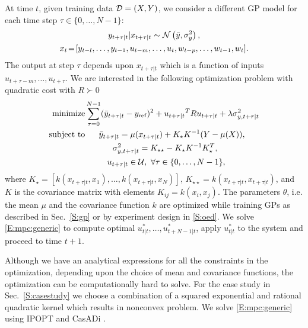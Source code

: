 At time \(t\), given training data \(\mathcal{D} = (X,Y) \), we consider a different GP model for each time step \(\tau \in \{0,\dots,N-1\}\):
\begin{gather}
y_{t+\tau|t} | x_{t+\tau|t} \sim \operatorname*{\mathcal{N}}\left(\bar{y}, \sigma^2_y\right), \\
x_{t}\!=\![y_{t-l}, \dots, y_{t-1}, u_{t-m}, \dots, u_t, w_{t-p}, \dots, w_{t-1}, w_t]. \nonumber
\end{gather}
The output at step \(\tau\) depends upon \(x_{t+\tau|t}\)  which is a function of inputs \(u_{t+\tau-m}, \dots, u_{t+\tau}\).
We are interested in the following optimization problem with quadratic cost with \(R \succ 0\)
\begin{align}
\label{E:mpc:generic}
\minimize & \sum_{\tau=0}^{N-1} (\bar{y}_{t+\tau|t}-y_{\mathrm{ref}})^2 + {u_{t+\tau|t}}^T R {u_{t+\tau|t}}+ \lambda \sigma^2_{y,t+\tau|t} \nonumber \\
\st & \ \ \ \ \ \bar{y}_{t+\tau|t} = \mu(x_{t+\tau|t}) + K_\star K^{-1} (Y - \mu(X)), \nonumber\\
& \ \ \ \ \ \ \ \ \ \ \sigma^2_{y,t+\tau|t} = K_{\star \star} - K_\star K^{-1} K_\star^T, \\
& \ \ \ \ \ \ \ \  u_{t+\tau|t} \in \mathcal{U}, \  \forall \tau \in \{0,\dots,N-1\}, \nonumber
\end{align}
where \(K_\star = [k(x_{t+\tau|t}, x_1), \dots, k(x_{t+\tau|t}, x_N)]\), \(K_{\star \star} = k(x_{t+\tau|t}, x_{t+\tau|t})\), and $K$ is the covariance matrix with elements \(K_{ij} = k(x_i, x_j)\). The parameters \(\theta\), i.e. the mean \(\mu\) and the covariance function \(k\) are optimized while training GPs as described in Sec.~\ref{S:gp} or by experiment design in \ref{S:oed}. We solve \eqref{E:mpc:generic} to compute optimal \(u_{t|t}^*, \dots, u_{t+N-1|t}^*\), apply \(u_{t|t}^*\) to the system and proceed to time \(t+1\).

Although we have an analytical expressions for all the constraints in the optimization, depending upon the choice of mean and covariance functions, the optimization can be computationally hard to solve. For the case study in Sec.~\ref{S:casestudy} we choose a combination of a squared exponential and rational quadratic kernel which results in nonconvex problem. We solve \eqref{E:mpc:generic} using IPOPT \cite{Waechter2009b} and CasADi \cite{Andersson2013b}.



